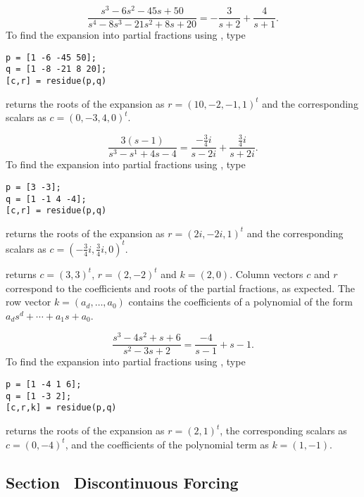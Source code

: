 \documentclass{ximera}
\begin{document}
 \ans
\[
\frac{s^3 - 6s^2 - 45s + 50}{s^4 - 8s^3 - 21s^2 + 8s + 20}
= -\frac{3}{s + 2} + \frac{4}{s + 1}.
\]
\soln To find the expansion into partial fractions using \Matlabp, type
\begin{verbatim}
p = [1 -6 -45 50];
q = [1 -8 -21 8 20];
[c,r] = residue(p,q)
\end{verbatim}
\Matlab returns the roots of the expansion as $r = (10,-2,-1,1)^t$ and
the corresponding scalars as $c = (0,-3,4,0)^t$.

 \ans
\[
\frac{3(s - 1)}{s^3 - s^1 + 4s - 4} = \frac{-\frac{3}{4}i}{s - 2i}
+ \frac{\frac{3}{4}i}{s + 2i}.
\]
\soln To find the expansion into partial fractions using \Matlabp, type
\begin{verbatim}
p = [3 -3];
q = [1 -1 4 -4];
[c,r] = residue(p,q)
\end{verbatim}
\newpage
\Matlab returns the roots of the expansion as $r = (2i,-2i,1)^t$ and
the corresponding scalars as $c = (-\frac{3}{4}i,\frac{3}{4}i,0)^t$.

\Matlab returns $c = (3,3)^t$, $r = (2,-2)^t$ and $k = (2,0)$.
Column vectors $c$ and $r$ correspond to the coefficients and roots of
the partial fractions, as expected.  The row vector $k =
(a_d,\dots,a_0)$ contains the coefficients of a polynomial of the form
$a_ds^d + \cdots + a_1s + a_0$.

\ans
\[
\frac{s^3 - 4s^2 + s + 6}{s^2 - 3s + 2}
= \frac{-4}{s - 1} + s - 1.
\]
\soln To find the expansion into partial fractions using \Matlabp, type
\begin{verbatim}
p = [1 -4 1 6];
q = [1 -3 2];
[c,r,k] = residue(p,q)
\end{verbatim}
\Matlab returns the roots of the expansion as $r = (2,1)^t$, the
corresponding scalars as $c = (0,-4)^t$, and the coefficients of the
polynomial term as $k = (1,-1)$.



\subsection*{Section~\protect{\ref{S:13.4}} Discontinuous Forcing}
\end{document}
